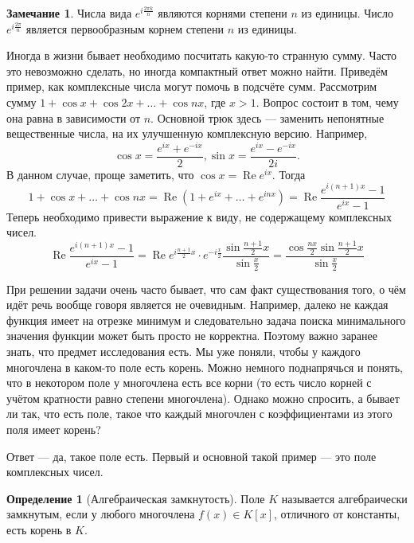 \documentclass[10pt,a4paper,oneside]{book}
\theoremstyle{definition}
\newtheorem*{rem}{Замечание}
\newtheorem{defn}{Определение}
\newcommand{\re}{\operatorname{Re}}
\def\dfn{\begin{defn}}
\def\edfn{\end{defn}}
\def\rm{\begin{rem}}
\def\erm{\end{rem}}
\begin{document}
\rm Числа вида $e^{i\frac{2\pi k}{n}}$ являются корнями степени $n$ из единицы. Число $e^{i\frac{2\pi }{n}}$ является первообразным корнем степени $n$ из единицы.
\erm

Иногда в жизни бывает необходимо посчитать какую-то странную сумму. Часто это невозможно сделать, но иногда компактный ответ можно найти. Приведём пример, как комплексные числа могут помочь в подсчёте сумм.
Рассмотрим сумму $1+ \cos x + \cos 2x + \dots + \cos nx$, где $x > 1$. Вопрос состоит в том, чему она равна в зависимости от $n$. Основной трюк здесь --- заменить непонятные вещественные числа, на их улучшенную комплексную версию. Например, $$\cos x = \frac{e^{ix}+e^{-ix}}{2}, \sin x = \frac{e^{ix}-e^{-ix}}{2i}.$$ 
В данном случае, проще заметить, что $\cos x=\re e^{ix}$. Тогда
$$1 + \cos x+ \dots + \cos nx = \re(1+ e^{ix} + \dots + e^{inx}) = \re \frac{e^{i(n+1)x}-1}{e^{ix}-1}$$
Теперь необходимо привести выражение к виду, не содержащему комплексных чисел.
$$\re \frac{e^{i(n+1)x}-1}{e^{ix}-1} = \re e^{i\tfrac{n+1}{2}x}\cdot e^{-i\tfrac{x}{2}}\frac{\sin \tfrac{n+1}{2}x}{\sin\tfrac{x}{2}}= \frac{\cos \tfrac{nx}{2} \sin \tfrac{n+1}{2}x}{\sin\tfrac{x}{2}}$$


При решении задачи очень часто бывает, что сам факт существования того, о чём идёт речь вообще говоря является не очевидным. Например, далеко не каждая функция имеет на отрезке минимум и следовательно задача поиска минимального значения функции может быть просто не корректна. Поэтому важно заранее знать, что предмет исследования есть. Мы уже поняли, чтобы у каждого многочлена в каком-то поле есть корень. Можно немного поднапрячься и понять, что в некотором поле у многочлена есть все корни (то есть число корней с учётом кратности равно степени многочлена). Однако можно спросить, а бывает ли так, что есть поле, такое что каждый многочлен с коэффициентами из этого поля имеет корень?

Ответ — да, такое поле есть. Первый и основной такой пример --- это поле комплексных чисел.
\dfn[Алгебраическая замкнутость] Поле $K$ называется алгебраически замкнутым, если у любого многочлена  $f(x)\in K[x]$, отличного от константы, есть корень в $K$.
\edfn
\end{document}
